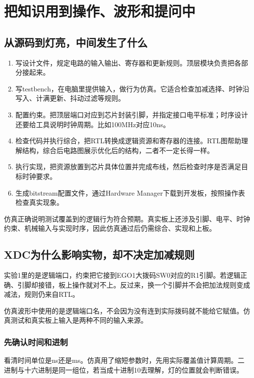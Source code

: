 \clearpage\section{把知识用到操作、波形和提问中}
\subsection{从源码到灯亮，中间发生了什么}
\begin{enumerate}
\item 写设计文件，规定电路的输入输出、寄存器和更新规则。顶层模块负责把各部分接起来。
\item 写testbench，在电脑里提供输入，做行为仿真。它适合检查加减选择、时钟沿写入、计满更新、抖动过滤等规则。
\item 配置约束。把顶层端口对应到芯片封装引脚，并指定接口电平标准；时序设计还要给工具说明时钟周期。比如100MHz对应10ns。
\item 检查代码并执行综合，把RTL转换成逻辑资源和寄存器的连接。RTL图帮助理解结构，综合后电路图展示优化后的结构，二者不一定长得一样。
\item 执行实现，把资源放置到芯片具体位置并完成布线，然后检查时序是否满足目标时钟要求。
\item 生成bitstream配置文件，通过Hardware Manager下载到开发板，按照操作表检查真实现象。
\end{enumerate}

仿真正确说明测试覆盖到的逻辑行为符合预期。真实板上还涉及引脚、电平、时钟约束、机械输入与实现时序，因此仿真通过后仍需综合、实现和上板。

\subsection{XDC为什么影响实物，却不决定加减规则}
实验1里的是逻辑端口，约束把它接到EGO1大拨码SW0对应的R1引脚。若逻辑正确、引脚却接错，板上操作就对不上。反过来，换一个引脚并不会把加法规则变成减法，规则仍来自RTL。

仿真波形中使用的是逻辑端口名，不会因为没有连到实际拨码就不能给它赋值。仿真测试和真实板上输入是两种不同的输入来源。

\subsubsection{先确认时间和进制}
看清时间单位是ns还是ms。仿真用了缩短参数时，先用实际覆盖值计算周期。二进制与十六进制是同一组位，若当成十进制10去理解，灯的位置就会判断错误。

